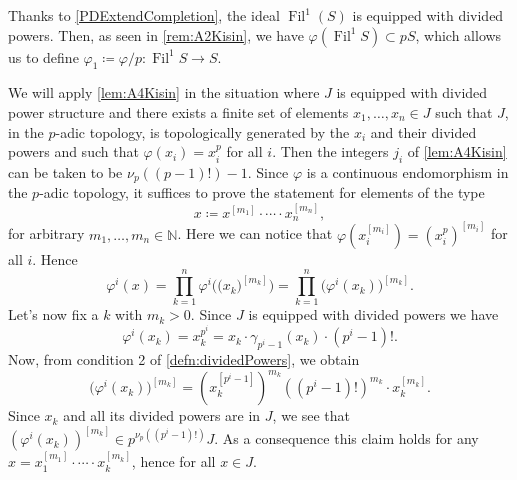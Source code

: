 \begin{ntt}[]\label{not:phi1S}
	Thanks to \cref{PDExtendCompletion}, the ideal 
	$\operatorname{Fil}^1(S)$ is equipped with divided powers.
	Then, as seen in \cref{rem:A2Kisin}, 
	we have $\varphi( \operatorname{Fil}^1 S) \subset p S$, which
	allows us to define $\varphi_1 \coloneqq \varphi/p\colon
	\operatorname{Fil}^1S \to S$.
\end{ntt}


\begin{rem}[]\label{rem:j_iTheoremA6}
	We will apply \cref{lem:A4Kisin} in the situation where $J$ is equipped
	with divided power structure and there exists a finite set of 
	elements $x_1, \ldots, x_n \in J$ such that $J$, in the $p$-adic topology, 
	is topologically generated by the $x_i$ and their divided powers
	and such that $\varphi(x_i) = x_i^p$ for all $i$.
	Then the integers $j_i$ of \cref{lem:A4Kisin} can
	be taken to be $\nu_p \left( (p-1)! \right) - 1$.
	Since $\varphi$ is a continuous endomorphism in the $p$-adic topology,
	it suffices to prove the statement for elements of the type
	\begin{equation*}
	x \coloneqq x^{[m_1]} \cdot \cdots \cdot x_n^{[m_n]}
	,\end{equation*}
	for arbitrary $m_1, \ldots, m_n \in \mathbb{N}$.
	Here we can notice that $\varphi(x_i^{[m_i]}) = \left( x_i^p \right)^{[m_i]}$
	for all $i$.
	Hence
	\begin{equation*}
		\varphi^i (x) = 
		\prod_{k = 1}^n \varphi^i \Big(\big( x_k \big)^{[m_k]}\Big) =
		\prod_{k = 1}^n 
		\big( \varphi^i(x_k) \big)^{[m_k]}
	.\end{equation*}
	Let's now fix a $k$ with $m_k > 0$.
	Since $J$ is equipped with divided powers we have
	\begin{equation*}
		\varphi^i(x_k) =
		x_k^{p^i} =
		x_k \cdot \gamma_{p^i-1}(x_k) \cdot (p^i-1)!
	.\end{equation*}
	Now, from condition 2 of \cref{defn:dividedPowers}, we obtain
	\begin{equation*}
		\big( \varphi^i(x_k) \big)^{[m_k]} =
		\left( x_k^{[p^i-1]} \right)^{m_k}
		(\left( p^i - 1 \right)!)^{m_k} \cdot x_k^{[m_k]}
	.\end{equation*}
	Since $x_k$ and all its divided powers are in $J$,
	we see that $(\varphi^i(x_k))^{[m_k]} \in p^{\nu_p((p^i-1)!)}J$.
	As a consequence this claim holds for any 
	$x = x_1^{[m_1]} \cdot \cdots \cdot x_k^{[m_k]}$, hence for all $x \in J$.
\end{rem}


